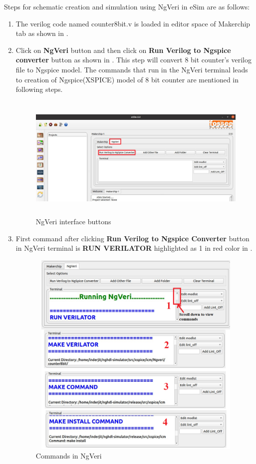 Steps for schematic creation and simulation using NgVeri in eSim are as follows: 

\begin{enumerate}
\item The verilog code named counter8bit.v is loaded in editor space of Makerchip tab as shown in .


\item Click on \textbf{NgVeri} button and then click on \textbf{Run Verilog to Ngspice converter} button as shown in . This step will convert 8 bit counter's verilog file to Ngspice model. The commands that run in the NgVeri terminal leads to creation of Ngspice(XSPICE) model of 8 bit counter are mentioned in following steps. 

\begin{figure}[H]
\centering
\includegraphics[width = 14cm, height =6cm]{./NgVeri/ngvericlick.png}
\caption{NgVeri interface buttons}
\label{ngclick}
\end{figure}

\item First command after clicking \textbf{Run Verilog to Ngspice Converter} button in NgVeri terminal is \textbf{RUN VERILATOR} highlighted as 1 in red color in . 


\begin{figure}[H]
\centering
\includegraphics[width = 14cm, height =10cm]{./NgVeri/runverilator.png}
\caption{Commands in NgVeri}
\label{ngvericommands}
\end{figure}


\end{enumerate}
